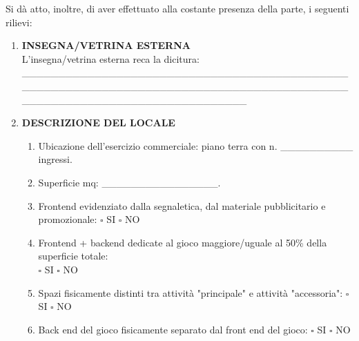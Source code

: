 \documentclass[12pt]{article}
\begin{document}
Si dà atto, inoltre, di aver effettuato alla costante presenza della parte, i seguenti rilievi:
\begin{enumerate}[label={}]
    \item \textbf{INSEGNA/VETRINA ESTERNA} \\
        L'insegna/vetrina esterna reca la dicitura: \\
        \_\_\_\_\_\_\_\_\_\_\_\_\_\_\_\_\_\_\_\_\_\_\_\_\_\_\_\_\_\_\_\_\_\_\_\_\_\_\_\_\_\_\_\_\_\_\_\_\_\_\_\_\_\_\_\_\_\_\_\_\_\_\_\_\_\_\_\_\_\_\_\_\_\_\_\_\_\_\_\_\_\_\_\_\_\_\_\_\_\_\_\_\_\_\_\_\_\_\_\_\_\_\_\_\_\_\_\_\_\_\_\_\_\_\_\_\_\_\_\_\_
    \item \textbf{DESCRIZIONE DEL LOCALE}
    \begin{enumerate}
        \item Ubicazione dell'esercizio commerciale: piano terra con n. \_\_\_\_\_\_\_\_\_\_ ingressi.
        \item Superficie mq: \_\_\_\_\_\_\_\_\_\_\_\_\_\_\_\_.
        \item Frontend evidenziato dalla segnaletica, dal materiale pubblicitario e promozionale:
            \begin{math}\square\end{math} SI \begin{math}\square\end{math} NO
        \item Frontend + backend dedicate al gioco maggiore/uguale al 50\% della superficie totale:             \\\begin{math}\square\end{math} SI
            \begin{math}\square\end{math} NO
        \item Spazi fisicamente distinti tra attività "principale" e attività "accessoria":
            \begin{math}\square\end{math} SI
            \begin{math}\square\end{math} NO
        \item Back end del gioco fisicamente separato dal front end del gioco:
            \begin{math}\square\end{math} SI
            \begin{math}\square\end{math} NO
    \end{enumerate}


\end{enumerate}
\end{document}
